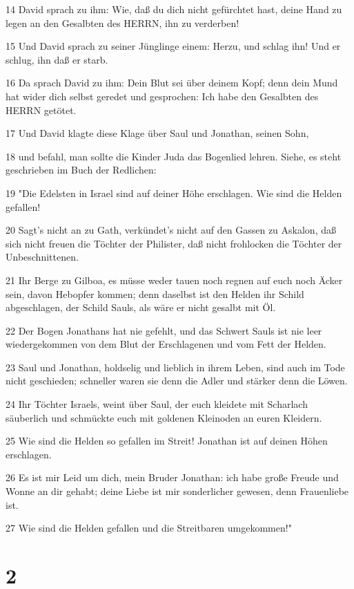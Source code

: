 \par 14 David sprach zu ihm: Wie, daß du dich nicht gefürchtet hast, deine Hand zu legen an den Gesalbten des HERRN, ihn zu verderben!
\par 15 Und David sprach zu seiner Jünglinge einem: Herzu, und schlag ihn! Und er schlug, ihn daß er starb.
\par 16 Da sprach David zu ihm: Dein Blut sei über deinem Kopf; denn dein Mund hat wider dich selbst geredet und gesprochen: Ich habe den Gesalbten des HERRN getötet.
\par 17 Und David klagte diese Klage über Saul und Jonathan, seinen Sohn,
\par 18 und befahl, man sollte die Kinder Juda das Bogenlied lehren. Siehe, es steht geschrieben im Buch der Redlichen:
\par 19 "Die Edelsten in Israel sind auf deiner Höhe erschlagen. Wie sind die Helden gefallen!
\par 20 Sagt's nicht an zu Gath, verkündet's nicht auf den Gassen zu Askalon, daß sich nicht freuen die Töchter der Philister, daß nicht frohlocken die Töchter der Unbeschnittenen.
\par 21 Ihr Berge zu Gilboa, es müsse weder tauen noch regnen auf euch noch Äcker sein, davon Hebopfer kommen; denn daselbst ist den Helden ihr Schild abgeschlagen, der Schild Sauls, als wäre er nicht gesalbt mit Öl.
\par 22 Der Bogen Jonathans hat nie gefehlt, und das Schwert Sauls ist nie leer wiedergekommen von dem Blut der Erschlagenen und vom Fett der Helden.
\par 23 Saul und Jonathan, holdselig und lieblich in ihrem Leben, sind auch im Tode nicht geschieden; schneller waren sie denn die Adler und stärker denn die Löwen.
\par 24 Ihr Töchter Israels, weint über Saul, der euch kleidete mit Scharlach säuberlich und schmückte euch mit goldenen Kleinoden an euren Kleidern.
\par 25 Wie sind die Helden so gefallen im Streit! Jonathan ist auf deinen Höhen erschlagen.
\par 26 Es ist mir Leid um dich, mein Bruder Jonathan: ich habe große Freude und Wonne an dir gehabt; deine Liebe ist mir sonderlicher gewesen, denn Frauenliebe ist.
\par 27 Wie sind die Helden gefallen und die Streitbaren umgekommen!"

\chapter{2}


